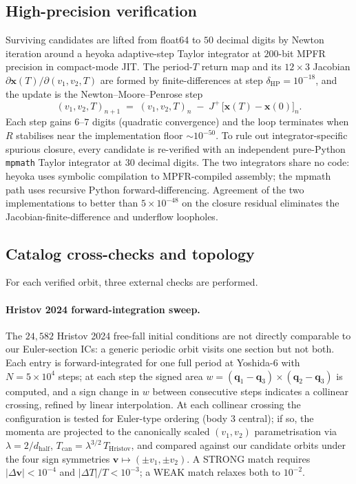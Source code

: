 \documentclass[10pt]{article}
\newcommand{\vvec}{\mathbf{v}}
\newcommand{\xvec}{\mathbf{x}}
\newcommand{\qvec}{\mathbf{q}}
\begin{document}
\subsection{High-precision verification}
\label{sec:hp}

Surviving candidates are lifted from float64 to $50$ decimal digits by
Newton iteration around a heyoka \citep{heyoka} adaptive-step Taylor
integrator at $200$-bit MPFR precision in compact-mode JIT. The
period-$T$ return map and its $12 \times 3$ Jacobian
$\partial \xvec(T)/\partial(v_1, v_2, T)$ are formed by
finite-differences at step $\delta_{\mathrm{HP}} = 10^{-18}$, and the
update is the Newton--Moore--Penrose step
\begin{equation}
  (v_1, v_2, T)_{n+1} \;=\; (v_1, v_2, T)_{n}
   \;-\; J^{+} \,\bigl[\xvec(T) - \xvec(0)\bigr]_{n}.
  \label{eq:newton}
\end{equation}
Each step gains $6$--$7$ digits (quadratic convergence) and the loop
terminates when $R$ stabilises near the implementation floor
$\sim\!10^{-50}$. To rule out integrator-specific spurious closure,
every candidate is re-verified with an independent pure-Python
\texttt{mpmath} Taylor integrator at $30$ decimal digits. The two
integrators share no code: heyoka uses symbolic compilation to
MPFR-compiled assembly; the mpmath path uses recursive Python
forward-differencing. Agreement of the two implementations to better
than $5 \times 10^{-48}$ on the closure residual eliminates the
Jacobian-finite-difference and underflow loopholes.

\subsection{Catalog cross-checks and topology}
\label{sec:catalog-checks}

For each verified orbit, three external checks are performed.

\paragraph{Hristov 2024 forward-integration sweep.}
The $24{,}582$ Hristov 2024 free-fall initial conditions
\citep{Hristov2024Catalog} are not directly comparable to our
Euler-section ICs: a generic periodic orbit visits one section but not
both. Each entry is forward-integrated for one full period at
Yoshida-$6$ with $N = 5\!\times\!10^4$ steps; at each step the signed
area $w = (\qvec_1 - \qvec_3) \times (\qvec_2 - \qvec_3)$ is computed,
and a sign change in $w$ between consecutive steps indicates a
collinear crossing, refined by linear interpolation. At each collinear
crossing the configuration is tested for Euler-type ordering (body $3$
central); if so, the momenta are projected to the canonically scaled
$(v_1, v_2)$ parametrisation via
$\lambda = 2/d_{\mathrm{half}}$, $T_{\mathrm{can}} = \lambda^{3/2}\,
T_{\mathrm{Hristov}}$, and compared against our candidate orbits under
the four sign symmetries $\vvec \mapsto (\pm v_1, \pm v_2)$. A STRONG
match requires $|\Delta \vvec| < 10^{-4}$ and $|\Delta T|/T < 10^{-3}$;
a WEAK match relaxes both to $10^{-2}$.
\end{document}
